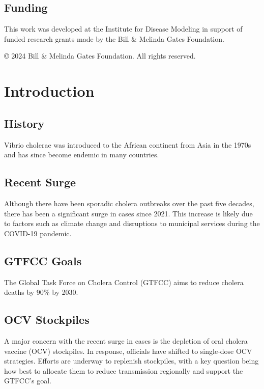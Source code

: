 \documentclass[
]{book}
\begin{document}
\section*{Funding}\label{funding}

This work was developed at the Institute for Disease Modeling in support of funded research grants made by the Bill \& Melinda Gates Foundation.

{
© 2024 Bill \& Melinda Gates Foundation. All rights reserved.
}

\chapter{Introduction}\label{introduction}

\section{History}\label{history}

Vibrio cholerae was introduced to the African continent from Asia in the 1970s and has since become endemic in many countries.

\section{Recent Surge}\label{recent-surge}

Although there have been sporadic cholera outbreaks over the past five decades, there has been a significant surge in cases since 2021. This increase is likely due to factors such as climate change and disruptions to municipal services during the COVID-19 pandemic.

\section{GTFCC Goals}\label{gtfcc-goals}

The Global Task Force on Cholera Control (GTFCC) aims to reduce cholera deaths by 90\% by 2030.

\section{OCV Stockpiles}\label{ocv-stockpiles}

A major concern with the recent surge in cases is the depletion of oral cholera vaccine (OCV) stockpiles. In response, officials have shifted to single-dose OCV strategies. Efforts are underway to replenish stockpiles, with a key question being how best to allocate them to reduce transmission regionally and support the GTFCC's goal.
\end{document}
